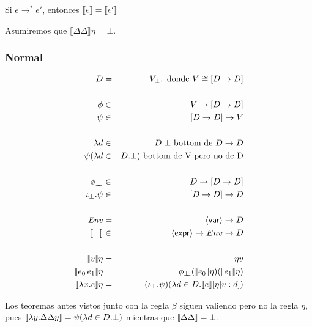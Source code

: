     \begin{corollary}
      Si $e \to^{\ast} e'$, entonces $[\![e]\!] = [\![e']\!]$
    \end{corollary}
        
    \PN Asumiremos que $\llbracket\Delta \Delta\rrbracket\eta = \bot$.

    \subsubsection{Normal}
      \begin{eqnarray*}
        D &=& V_\bot, \text{ donde } V \cong [D \to  D] \\ \\
        \phi &\in& V \to  [D \to  D] \\
        \psi &\in& [D \to  D] \to  V \\ \\ 
        \lambda d &\in& D. \bot \text{ bottom de } D \rightarrow D \\
        \psi(\lambda d &\in& D. \bot) \text{ bottom de V pero no de D} \\ \\
        \phi_{\botbot} &\in& D \to  [D \to  D] \\
        \iota_\bot . \psi &\in& [D \to  D] \to  D \\ \\
        \Env &=& \var \to  D \\
        \llbracket\_\rrbracket &\in& \expr \to  Env \to  D \\ \\
        \llbracket v \rrbracket\eta &=& \eta v \\
        \llbracket e_0\, e_1\rrbracket\eta &=& \phi_{\botbot} (\llbracket e_0\rrbracket\eta) (\llbracket e_1\rrbracket\eta) \\
        \llbracket\lambda x.e\rrbracket\eta &=& (\iota_\bot . \psi)(\lambda d \in D. \llbracket e\rrbracket[\eta|v:d])
      \end{eqnarray*}

      \PN Los teoremas antes vistos junto con la regla $\beta$ siguen valiendo pero no la regla $\eta$, pues $[\![\lambda y. \Delta\Delta y]\!] = \psi(\lambda d \in D.\bot)$ mientras que $[\![\Delta\Delta]\!] = \bot$.
    
